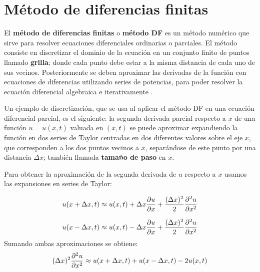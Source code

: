 \documentclass[12pt]{article}
\begin{document}
	\newpage
	\tableofcontents
	\clearpage
	
	\section{Método de diferencias finitas}
	El \textbf{método de diferencias finitas} o \textbf{método DF} es un método numérico que sirve para resolver ecuaciones diferenciales ordinarias o parciales. El método consiste en discretizar el dominio de la ecuación en un conjunto finito de puntos llamado \textbf{grilla}; donde cada punto debe estar a la misma distancia de cada uno de sus vecinos. Posteriormente se deben aproximar las derivadas de la función con ecuaciones de diferencias utilizando series de potencias, para poder resolver la ecuación diferencial algebraica e iterativamente \cite{devries2011first}.
	
	Un ejemplo de discretización, que se usa al aplicar el método DF en una ecuación diferencial parcial, es el siguiente: la segunda derivada parcial respecto a $x$ de una función $u = u(x,t)$ valuada en $(x,t)$ se puede aproximar expandiendo la función en dos series de Taylor centradas en dos diferentes valores sobre el eje $x$, que corresponden a los dos puntos vecinos a $x$, separándose de este punto por una distancia $\Delta x$; también llamada \textbf{tamaño de paso} en $x$. 
	
	Para obtener la aproximación de la segunda derivada de $u$ respecto a $x$ usamos las expansiones en series de Taylor:

	\begin{equation}
		u(x + \Delta x,t) \approx u(x,t) + \Delta x\pdv{u}{x}+ \frac{(\Delta x)^{2}}{2}\pdv{^{2}u}{x^2} 
	\end{equation}

	\begin{equation}
		u(x - \Delta x,t) \approx u(x,t) - \Delta x\pdv{u}{x}+\frac{(\Delta x)^{2}}{2}\pdv{^{2}u}{x^2} 
	\end{equation}
	Sumando ambas aproximaciones se obtiene:
	\begin{equation}
		(\Delta x)^2 \pdv{^{2}u}{x^2}\approx u(x + \Delta x,t) + u(x - \Delta x,t) - 2 u(x,t)
	\end{equation}
\end{document}
